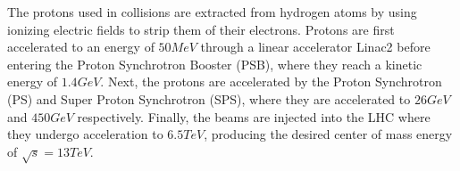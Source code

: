 The protons used in collisions are extracted from hydrogen atoms by using ionizing electric fields to strip them of their electrons. Protons are first accelerated to an energy of $50\unit{MeV}$ through a linear accelerator Linac2 before entering the Proton Synchrotron Booster (PSB), where they reach a kinetic energy of $1.4\unit{GeV}$. Next, the protons are accelerated by the Proton Synchrotron (PS) and Super Proton Synchrotron (SPS), where they are accelerated to $26\unit{GeV}$ and $450\unit{GeV}$ respectively. Finally, the beams are injected into the LHC where they undergo acceleration to $6.5\unit{TeV}$, producing the desired center of mass energy of $\sqrt{s}=13\unit{TeV}$.

